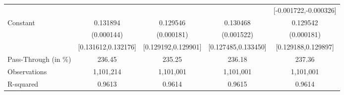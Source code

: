{\begin{tabular}{l*{4}{c}}
                    &                     &                     &                     &[-0.001722,-0.000326]         \\
Constant            &    0.131894\sym{***}&    0.129546\sym{***}&    0.130468\sym{***}&    0.129542\sym{***}\\
                    &  (0.000144)         &  (0.000181)         &  (0.001522)         &  (0.000181)         \\
                    &[0.131612,0.132176]         &[0.129192,0.129901]         &[0.127485,0.133450]         &[0.129188,0.129897]         \\
\midrule
Pass-Through (in \%)&      236.45         &      235.25         &      236.18         &      237.36         \\
Observations        &   1,101,214         &   1,101,001         &   1,101,001         &   1,101,001         \\
R-squared           &      0.9613         &      0.9614         &      0.9615         &      0.9614         \\
\bottomrule
\end{tabular}
}

